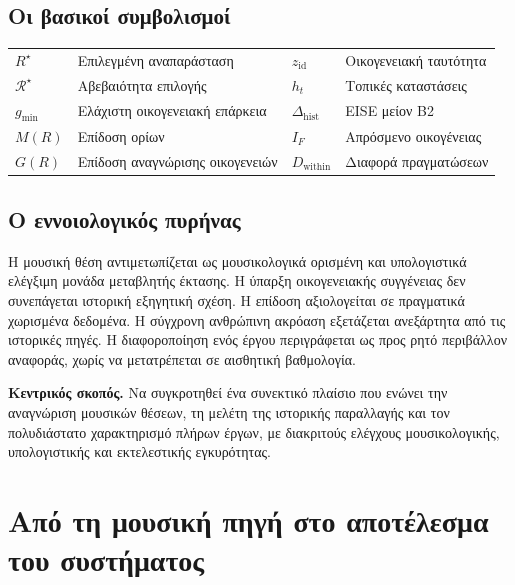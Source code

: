 \documentclass[11pt,a4paper]{extarticle}
\begin{document}
\subsection*{Οι βασικοί συμβολισμοί}
\begin{tabularx}{\linewidth}{>{\bfseries}p{2.3cm}X>{\bfseries}p{2.5cm}X}
\(R^\star\) & Επιλεγμένη αναπαράσταση & \(z_{\mathrm{id}}\) & Οικογενειακή ταυτότητα\\
\(\mathcal R^\star\) & Αβεβαιότητα επιλογής & \(h_t\) & Τοπικές καταστάσεις\\
\(g_{\min}\) & Ελάχιστη οικογενειακή επάρκεια & \(\Delta_{\mathrm{hist}}\) & EISE μείον B2\\
\(M(R)\) & Επίδοση ορίων & \(I_F\) & Απρόσμενο οικογένειας\\
\(G(R)\) & Επίδοση αναγνώρισης οικογενειών & \(D_{\mathrm{within}}\) & Διαφορά πραγματώσεων\\
\end{tabularx}

\subsection*{Ο εννοιολογικός πυρήνας}
Η μουσική θέση αντιμετωπίζεται ως μουσικολογικά ορισμένη και υπολογιστικά ελέγξιμη μονάδα μεταβλητής έκτασης. Η ύπαρξη οικογενειακής συγγένειας δεν συνεπάγεται ιστορική εξηγητική σχέση. Η επίδοση αξιολογείται σε πραγματικά χωρισμένα δεδομένα. Η σύγχρονη ανθρώπινη ακρόαση εξετάζεται ανεξάρτητα από τις ιστορικές πηγές. Η διαφοροποίηση ενός έργου περιγράφεται ως προς ρητό περιβάλλον αναφοράς, χωρίς να μετατρέπεται σε αισθητική βαθμολογία.

\begin{keybox}
\textbf{Κεντρικός σκοπός.} Να συγκροτηθεί ένα συνεκτικό πλαίσιο που ενώνει την αναγνώριση μουσικών θέσεων, τη μελέτη της ιστορικής παραλλαγής και τον πολυδιάστατο χαρακτηρισμό πλήρων έργων, με διακριτούς ελέγχους μουσικολογικής, υπολογιστικής και εκτελεστικής εγκυρότητας.
\end{keybox}

\section{Από τη μουσική πηγή στο αποτέλεσμα του συστήματος}
\end{document}
